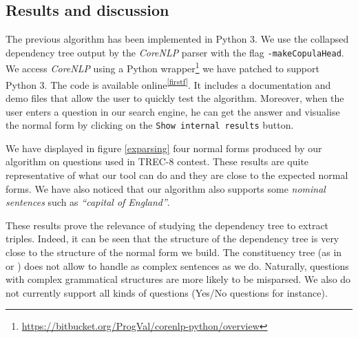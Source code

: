 
\subsection{Results and discussion}

The previous algorithm has been implemented in Python 3. We use the collapsed dependency tree output by the \textit{CoreNLP} parser with the flag \texttt{-makeCopulaHead}. We access \textit{CoreNLP} using a Python wrapper\footnote{\url{https://bitbucket.org/ProgVal/corenlp-python/overview}} we have patched to support Python 3. The code is available online\textsuperscript{\ref{firstf}}. It includes a documentation and demo files that allow the user to quickly test the algorithm. Moreover, when the user enters a question in our search engine, he can get the answer and visualise the normal form by clicking on the \texttt{Show internal results} button.

We have displayed in figure \ref{exparsing} four normal forms produced by our algorithm on questions used in TREC-8 contest. These results are quite representative of what our tool can do and they are close to the expected normal forms. We have also noticed that our algorithm also supports some \textit{nominal sentences} such as \textit{``capital of England''}. 

These results prove the relevance of studying the dependency tree to extract triples. Indeed, it can be seen that the structure of the dependency tree is very close to the structure of the normal form we build. The constituency tree (as in \cite{parsetree} or \cite{parsetree2}) does not allow to handle as complex sentences as we do. Naturally, questions with complex grammatical structures are more likely to be misparsed. We also do not currently support all kinds of questions (Yes/No questions for instance).

